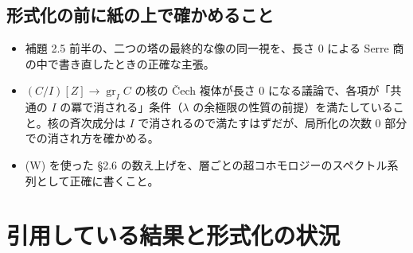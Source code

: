 \documentclass[11pt,a4paper]{ltjsarticle}
\theoremstyle{plain}
\theoremstyle{definition}
\newcommand{\gr}{\operatorname{gr}}
\begin{document}
\subsection{形式化の前に紙の上で確かめること}
\begin{itemize}
  \item 補題 2.5 前半の、二つの塔の最終的な像の同一視を、長さ $0$ による Serre 商の中で書き直したときの正確な主張。
  \item $(C/I)[Z]\to\gr_IC$ の核の Čech 複体が長さ $0$ になる議論で、各項が「共通の $I$ の冪で消される」条件（$\lambda$ の余極限の性質の前提）を満たしていること。核の斉次成分は $I$ で消されるので満たすはずだが、局所化の次数 $0$ 部分での消され方を確かめる。
  \item (W) を使った \S2.6 の数え上げを、層ごとの超コホモロジーのスペクトル系列として正確に書くこと。
\end{itemize}

\section{引用している結果と形式化の状況}\label{app:status}
\end{document}
